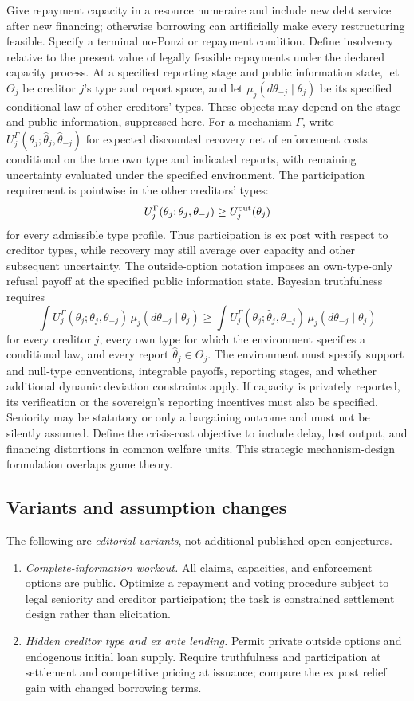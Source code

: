 \documentclass[11pt,a4paper]{article}
\begin{document}
Give repayment capacity in a resource numeraire and include new debt service after new financing; otherwise borrowing can artificially make every restructuring feasible. Specify a terminal no-Ponzi or repayment condition. Define insolvency relative to the present value of legally feasible repayments under the declared capacity process. At a specified reporting stage and public information state, let \(\Theta_j\) be creditor \(j\)'s type and report space, and let \(\mu_j(d\theta_{-j}\mid\theta_j)\) be its specified conditional law of other creditors' types. These objects may depend on the stage and public information, suppressed here. For a mechanism \(\Gamma\), write \(U_j^\Gamma(\theta_j;\hat\theta_j,\hat\theta_{-j})\) for expected discounted recovery net of enforcement costs conditional on the true own type and indicated reports, with remaining uncertainty evaluated under the specified environment. The participation requirement is pointwise in the other creditors' types:
\[
U_j^\Gamma(\theta_j;\theta_j,\theta_{-j})\ge U_j^{\rm out}(\theta_j)
\]
for every admissible type profile. Thus participation is ex post with respect to creditor types, while recovery may still average over capacity and other subsequent uncertainty. The outside-option notation imposes an own-type-only refusal payoff at the specified public information state. Bayesian truthfulness requires
\[
\int U_j^\Gamma(\theta_j;\theta_j,\theta_{-j})\,\mu_j(d\theta_{-j}\mid\theta_j)
\ge
\int U_j^\Gamma(\theta_j;\hat\theta_j,\theta_{-j})\,\mu_j(d\theta_{-j}\mid\theta_j)
\]
for every creditor \(j\), every own type for which the environment specifies a conditional law, and every report \(\hat\theta_j\in\Theta_j\). The environment must specify support and null-type conventions, integrable payoffs, reporting stages, and whether additional dynamic deviation constraints apply. If capacity is privately reported, its verification or the sovereign's reporting incentives must also be specified. Seniority may be statutory or only a bargaining outcome and must not be silently assumed. Define the crisis-cost objective to include delay, lost output, and financing distortions in common welfare units. This strategic mechanism-design formulation overlaps game theory.
\subsection*{Variants and assumption changes}
The following are \emph{editorial variants}, not additional published open conjectures.
\begin{enumerate}
\item \emph{Complete-information workout.} All claims, capacities, and enforcement options are public. Optimize a repayment and voting procedure subject to legal seniority and creditor participation; the task is constrained settlement design rather than elicitation.
\item \emph{Hidden creditor type and ex ante lending.} Permit private outside options and endogenous initial loan supply. Require truthfulness and participation at settlement and competitive pricing at issuance; compare the ex post relief gain with changed borrowing terms.
\end{enumerate}
\end{document}
